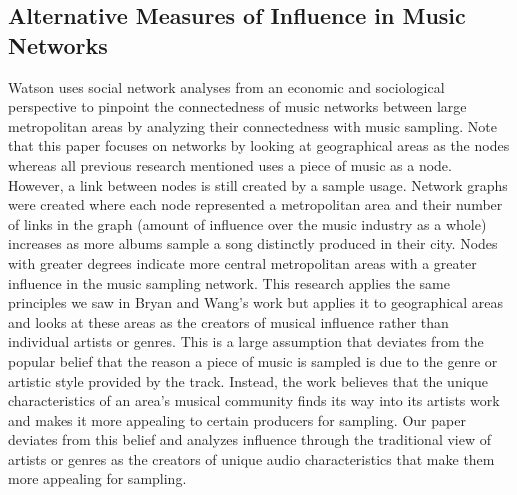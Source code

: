 \documentclass[pageno]{jpaper}
\begin{document}
\subsection{Alternative Measures of Influence in Music Networks}
Watson uses social network analyses from an economic and sociological perspective to pinpoint the connectedness of music networks between large metropolitan areas by analyzing their connectedness with music sampling. Note that this paper focuses on networks by looking at geographical areas as the nodes whereas all previous research mentioned uses a piece of music as a node. However, a link between nodes is still created by a sample usage. Network graphs were created where each node represented a metropolitan area and their number of links in the graph (amount of influence over the music industry as a whole) increases as more albums sample a song distinctly produced in their city. Nodes with greater degrees indicate more central metropolitan areas with a greater influence in the music sampling network. This research applies the same principles we saw in Bryan and Wang's work but applies it to geographical areas and looks at these areas as the creators of musical influence rather than individual artists or genres. This is a large assumption that deviates from the popular belief that the reason a piece of music is sampled is due to the genre or artistic style provided by the track. Instead, the work believes that the unique characteristics of an area's musical community finds its way into its artists work and makes it more appealing to certain producers for sampling. Our paper deviates from this belief and analyzes influence through the traditional view of artists or genres as the creators of unique audio characteristics that make them more appealing for sampling.
\cite{Watson}
\end{document}
